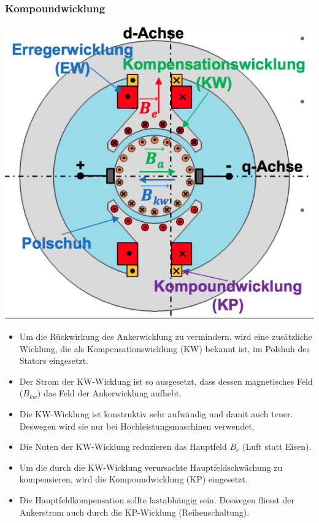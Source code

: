 \subsubsection{Kompoundwicklung}
\begin{minipage}{0.4 \linewidth}
\includegraphics[width = \linewidth]{./Pics/VL45/Kompoundwicklung}
\end{minipage}
\begin{minipage}{0.6 \linewidth}
\begin{itemize}
\item Um die Rückwirkung des Ankerwicklung zu vermindern, wird eine zusätzliche Wicklung, die als Kompensationswicklung (KW)  bekannt ist, im Polshuh des Stators eingesetzt.
\item Der Strom der KW-Wicklung ist so ausgesetzt, dass dessen magnetisches Feld ($B_{kw}$) das Feld der Ankerwicklung aufhebt.
\item Die KW-Wicklung ist konstruktiv sehr aufwändig und damit auch teuer. Deswegen wird sie nur bei Hochleistungsmaschinen verwendet.
\item Die Nuten der KW-Wicklung reduzieren das Hauptfeld $B_e$ (Luft statt Eisen).
\item Um die durch die KW-Wicklung verursachte Hauptfeldschwächung zu kompensieren, wird die Kompoundwicklung (KP) eingesetzt. 
\item Die Hauptfeldkompensation sollte lastabhängig sein. Deswegen fliesst der Ankerstrom auch durch die KP-Wicklung (Reihenschaltung). 
\end{itemize}
\end{minipage}

